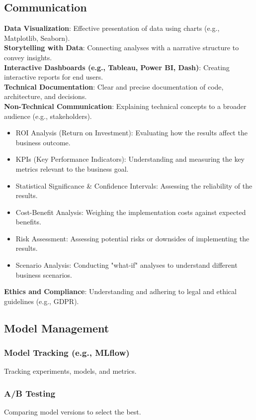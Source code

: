 \documentclass[english, threecolumn]{latex4ei/latex4ei_sheet}
\begin{document}
\begin{sectionbox}
\subsection{Communication}
    \textbf{Data Visualization}: Effective presentation of data using charts (e.g., Matplotlib, Seaborn).\\
    \textbf{Storytelling with Data}: Connecting analyses with a narrative structure to convey insights.\\
    \textbf{Interactive Dashboards (e.g., Tableau, Power BI, Dash)}: Creating interactive reports for end users.\\
    \textbf{Technical Documentation}: Clear and precise documentation of code, architecture, and decisions.\\
    \textbf{Non-Technical Communication}: Explaining technical concepts to a broader audience (e.g., stakeholders).\\
        \begin{itemize}
            \item ROI Analysis (Return on Investment): Evaluating how the results affect the business outcome.
            \item KPIs (Key Performance Indicators): Understanding and measuring the key metrics relevant to the business goal.
            \item Statistical Significance \& Confidence Intervals: Assessing the reliability of the results.
            \item Cost-Benefit Analysis: Weighing the implementation costs against expected benefits.
            \item Risk Assessment: Assessing potential risks or downsides of implementing the results.
            \item Scenario Analysis: Conducting "what-if" analyses to understand different business scenarios.
        \end{itemize}
    \textbf{Ethics and Compliance}: Understanding and adhering to legal and ethical guidelines (e.g., GDPR).
    
\subsection{Model Management}
    \subsubsection{Model Tracking (e.g., MLflow)} 
    Tracking experiments, models, and metrics.
    \subsubsection{A/B Testing}
    Comparing model versions to select the best.

\end{sectionbox}
\end{document}
